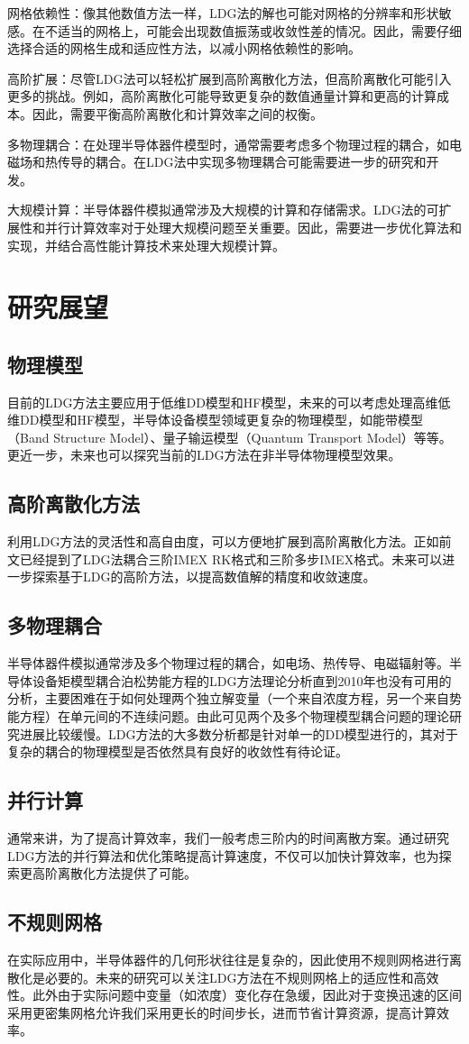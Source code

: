 网格依赖性：像其他数值方法一样，LDG法的解也可能对网格的分辨率和形状敏感。在不适当的网格上，可能会出现数值振荡或收敛性差的情况。因此，需要仔细选择合适的网格生成和适应性方法，以减小网格依赖性的影响。

高阶扩展：尽管LDG法可以轻松扩展到高阶离散化方法，但高阶离散化可能引入更多的挑战。例如，高阶离散化可能导致更复杂的数值通量计算和更高的计算成本。因此，需要平衡高阶离散化和计算效率之间的权衡。

多物理耦合：在处理半导体器件模型时，通常需要考虑多个物理过程的耦合，如电磁场和热传导的耦合。在LDG法中实现多物理耦合可能需要进一步的研究和开发。

大规模计算：半导体器件模拟通常涉及大规模的计算和存储需求。LDG法的可扩展性和并行计算效率对于处理大规模问题至关重要。因此，需要进一步优化算法和实现，并结合高性能计算技术来处理大规模计算。
\section{研究展望}
\subsection{物理模型}
目前的LDG方法主要应用于低维DD模型和HF模型，未来的可以考虑处理高维低维DD模型和HF模型，半导体设备模型领域更复杂的物理模型，如能带模型（Band Structure Model）、量子输运模型（Quantum Transport Model）等等。更近一步，未来也可以探究当前的LDG方法在非半导体物理模型效果。
\subsection{高阶离散化方法}
利用LDG方法的灵活性和高自由度，可以方便地扩展到高阶离散化方法。正如前文已经提到了LDG法耦合三阶IMEX RK格式和三阶多步IMEX格式\cite{wang2016stability}。未来可以进一步探索基于LDG的高阶方法，以提高数值解的精度和收敛速度。
\subsection{多物理耦合}
半导体器件模拟通常涉及多个物理过程的耦合，如电场、热传导、电磁辐射等。半导体设备矩模型耦合泊松势能方程的LDG方法理论分析直到2010年也没有可用的分析\cite{liu2010error}，主要困难在于如何处理两个独立解变量（一个来自浓度方程，另一个来自势能方程）在单元间的不连续问题。由此可见两个及多个物理模型耦合问题的理论研究进展比较缓慢。LDG方法的大多数分析都是针对单一的DD模型进行的，其对于复杂的耦合的物理模型是否依然具有良好的收敛性有待论证。
\subsection{并行计算}
通常来讲，为了提高计算效率，我们一般考虑三阶内的时间离散方案\cite{wang2016stability}。通过研究LDG方法的并行算法和优化策略提高计算速度，不仅可以加快计算效率，也为探索更高阶离散化方法提供了可能。
\subsection{不规则网格}
在实际应用中，半导体器件的几何形状往往是复杂的，因此使用不规则网格进行离散化是必要的。未来的研究可以关注LDG方法在不规则网格上的适应性和高效性。此外由于实际问题中变量（如浓度）变化存在急缓，因此对于变换迅速的区间采用更密集网格允许我们采用更长的时间步长，进而节省计算资源，提高计算效率\cite{肖红单2023半导体}。


\newpage
\begingroup
{}
\printbibliography[title={参考文献}]
\endgroup
